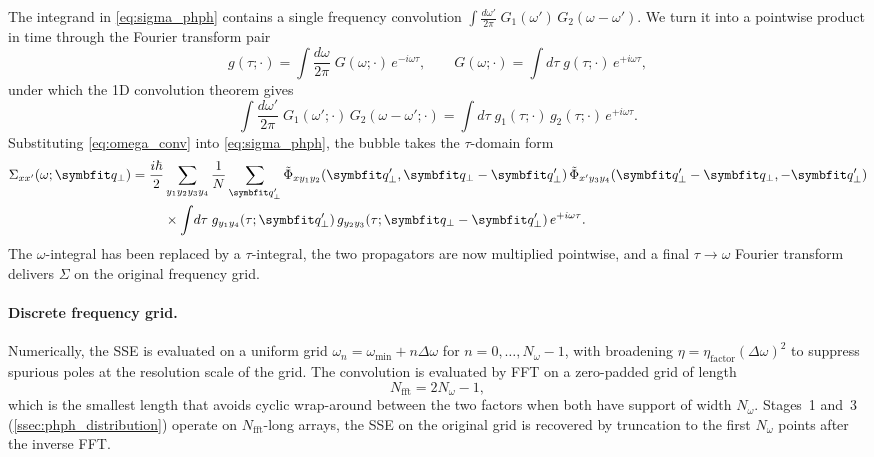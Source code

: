 The integrand in \cref{eq:sigma_phph} contains a single frequency
convolution $\int \frac{d\omega'}{2\pi}\;G_1(\omega')\,G_2(\omega-\omega')$. We
turn it into a pointwise product in time through the Fourier
transform pair
\begin{equation}\label{eq:g_tau}
  g(\tau;\cdot)
  = \int\!\frac{d\omega}{2\pi}\;
    G(\omega;\cdot)\,e^{-i\omega\tau},
  \qquad
  G(\omega;\cdot)
  = \int\!d\tau\;g(\tau;\cdot)\,e^{+i\omega\tau},
\end{equation}
under which the 1D convolution theorem gives
\begin{equation}\label{eq:omega_conv}
  \int\!\frac{d\omega'}{2\pi}\;
    G_1(\omega';\cdot)\,G_2(\omega-\omega';\cdot)
  = \int\!d\tau\;
    g_1(\tau;\cdot)\,g_2(\tau;\cdot)\,e^{+i\omega\tau}.
\end{equation}
Substituting \cref{eq:omega_conv} into \cref{eq:sigma_phph}, the
bubble takes the $\tau$-domain form
\begin{equation}\label{eq:sigma_phph_tau}
\begin{aligned}
  \Sigma_{xx'}(\omega;\qp)
  = \frac{i\hbar}{2}
    &\sum_{y_1y_2y_3y_4}
    \frac{1}{N}\sum_{\qp'}
    \tilde\Phi_{xy_1y_2}(\qp',\qp-\qp')\,
    \tilde\Phi_{x'y_3y_4}(\qp'-\qp,-\qp')\\
    &\times\int\!d\tau\;
    g_{y_1y_4}(\tau;\qp')\,g_{y_2y_3}(\tau;\qp-\qp')\,
    e^{+i\omega\tau}.
\end{aligned}
\end{equation}
The $\omega$-integral has been replaced by a $\tau$-integral, the
two propagators are now multiplied pointwise, and a
final $\tau\to\omega$ Fourier transform delivers
$\Sigma$ on the original frequency grid.

\paragraph{Discrete frequency grid.} Numerically, the SSE is
evaluated on a uniform grid
$\omega_n = \omega_\mathrm{min} + n\Delta\omega$ for
$n=0,\ldots,N_\omega-1$, with broadening
$\eta = \eta_\mathrm{factor}(\Delta\omega)^{2}$ to suppress
spurious poles at the resolution scale of the grid. The convolution
is evaluated by FFT on a zero-padded grid of length
\begin{equation}\label{eq:nfft_pad}
  N_\mathrm{fft} = 2N_\omega - 1,
\end{equation}
which is the smallest length that avoids cyclic wrap-around between
the two factors when both have support of width $N_\omega$. Stages~1 and~3
(\cref{ssec:phph_distribution}) operate on $N_\mathrm{fft}$-long
arrays, the SSE on the original grid is recovered by truncation to
the first $N_\omega$ points after the inverse FFT.

